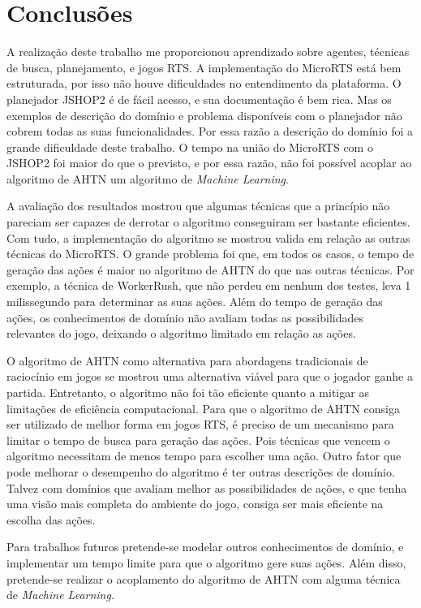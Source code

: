 
\chapter{\label{chap:concl}Conclusões}

A realização deste trabalho me proporcionou aprendizado sobre agentes, técnicas de busca, planejamento, e jogos RTS.
A implementação do MicroRTS está bem estruturada, por isso não houve dificuldades no entendimento da plataforma.
O planejador JSHOP2 é de fácil acesso, e sua documentação é bem rica.
Mas os exemplos de descrição do domínio e problema disponíveis com o planejador não cobrem todas as suas funcionalidades.
Por essa razão a descrição do domínio foi a grande dificuldade deste trabalho.
O tempo na união do MicroRTS com o JSHOP2 foi maior do que o previsto, e por essa razão, não foi possível acoplar ao algoritmo de AHTN um algoritmo de \textit{Machine Learning}.

A avaliação dos resultados mostrou que algumas técnicas que a princípio não pareciam ser capazes de derrotar o algoritmo conseguiram ser bastante eficientes.
Com tudo, a implementação do algoritmo se mostrou valida em relação as outras técnicas do MicroRTS.
O grande problema foi que, em todos os casos, o tempo de geração das ações é maior no algoritmo de AHTN do que nas outras técnicas.
Por exemplo, a técnica de WorkerRush, que não perdeu em nenhum dos testes, leva 1 milissegundo para determinar as suas ações.
Além do tempo de geração das ações, os conhecimentos de domínio não avaliam todas as possibilidades relevantes do jogo, deixando o algoritmo limitado em relação as ações.

O algoritmo de AHTN como alternativa para abordagens tradicionais de raciocínio em jogos se mostrou uma alternativa viável para que o jogador ganhe a partida.
Entretanto, o algoritmo não foi tão eficiente quanto a mitigar as limitações de eficiência computacional.
Para que o algoritmo de AHTN consiga ser utilizado de melhor forma em jogos RTS, é preciso de um mecanismo para limitar o tempo de busca para geração das ações.
Pois técnicas que vencem o algoritmo necessitam de menos tempo para escolher uma ação.
Outro fator que pode melhorar o desempenho do algoritmo é ter outras descrições de domínio.
Talvez com domínios que avaliam melhor as possibilidades de ações, e que tenha uma visão mais completa do ambiente do jogo, consiga ser mais eficiente na escolha das ações. 

Para trabalhos futuros pretende-se modelar outros conhecimentos de domínio, e implementar um tempo limite para que o algoritmo gere suas ações. 
Além disso, pretende-se realizar o acoplamento do algoritmo de AHTN com alguma técnica de \textit{Machine Learning}.

